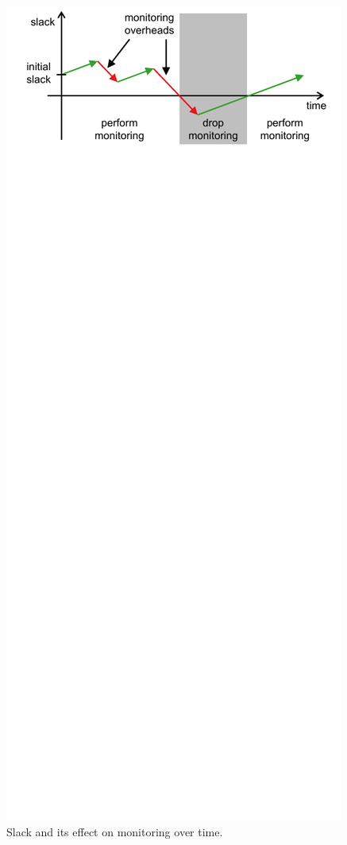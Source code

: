 \begin{figure} 
  \begin{center}
    \includegraphics[width=\columnwidth]{figs/slack.pdf} 
    \vspace{-0.1in}
    \caption{Slack and its effect on monitoring over time.}
    \label{fig:policies.slack} 
    \vspace{-0.3in} 
  \end{center} 
\end{figure}

